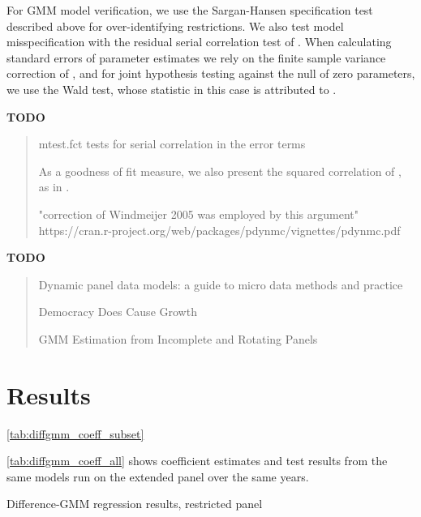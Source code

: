 \documentclass[12pt,a4paper]{article}
\begin{document}
For GMM model verification, we use the Sargan-Hansen specification test described above for over-identifying restrictions. 
We also test model misspecification with the residual serial correlation test of \cite{arellanoTestsSpecificationPanel1991}.
When calculating standard errors of parameter estimates we rely on the finite sample variance correction of \cite{windmeijerFiniteSampleCorrection2005}, and for joint hypothesis testing against the null of zero parameters, we use the Wald test, whose statistic in this case is attributed to \cite{hayashiEconometrics2000}.


\vspace{1cm}
\noindent\textbf{TODO}
\begin{quote}
mtest.fct tests for serial correlation in the error terms \cite{arellanoTestsSpecificationPanel1991}


As a goodness of fit measure, we also present the squared correlation of , as in \cite{bloomUncertaintyInvestmentDynamics2007}.


"correction of Windmeijer 2005 was employed by this argument" https://cran.r-project.org/web/packages/pdynmc/vignettes/pdynmc.pdf
\end{quote}

\vspace{1cm}
\noindent\textbf{TODO}
\begin{quote}\cite{petrovicUnderlyingCausalFactors2018}
Dynamic panel data models: a guide to micro data methods and practice \cite{bondDynamicPanelData2002}


Democracy Does Cause Growth \cite{acemogluDemocracyDoesCause2019}


GMM Estimation from Incomplete and Rotating Panels \cite{albarranGMMEstimationIncomplete2019}
\end{quote}

\section{Results}\label{sec:results}


\cref{tab:diffgmm_coeff_subset}


\cref{tab:diffgmm_coeff_all} shows coefficient estimates and test results from the same models run on the extended panel over the same years.


\renewcommand{\arraystretch}{3}
\begin{table}[htbp]
\centering

\caption{Difference-GMM regression results, restricted panel}
\label{tab:diffgmm_coeff_subset}
\end{table}
\renewcommand{\arraystretch}{1}
\end{document}
